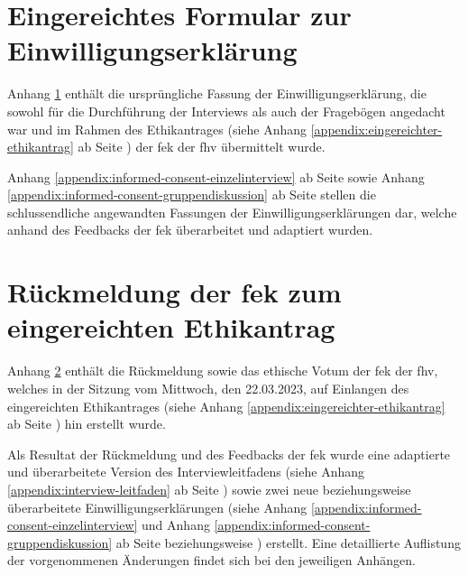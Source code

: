 \documentclass[a4paper,12pt,twoside]{scrreprt}
\begin{document}


\chapter{Eingereichtes Formular zur Einwilligungserklärung}
\label{appendix:ursprüngliches-informed-consent-formular}

Anhang \ref{appendix:ursprüngliches-informed-consent-formular} enthält die ursprüngliche Fassung der Einwilligungserklärung, die sowohl für die Durchführung der Interviews als auch der Fragebögen angedacht war und im Rahmen des Ethikantrages (siehe Anhang \ref{appendix:eingereichter-ethikantrag} ab Seite \pageref{appendix:eingereichter-ethikantrag}) der \acl{fek} der \acl{fhv} übermittelt wurde.

\medskip

Anhang \ref{appendix:informed-consent-einzelinterview} ab Seite \pageref{appendix:informed-consent-einzelinterview} sowie Anhang \ref{appendix:informed-consent-gruppendiskussion} ab Seite \pageref{appendix:informed-consent-gruppendiskussion} stellen die schlussendliche angewandten Fassungen der Einwilligungserklärungen dar, welche anhand des Feedbacks der \ac{fek} überarbeitet und adaptiert wurden.



\chapter{Rückmeldung der \acl{fek} zum eingereichten Ethikantrag}
\label{appendix:rückmeldung-fek}

Anhang \ref{appendix:rückmeldung-fek} enthält die Rückmeldung sowie das ethische Votum der \acl{fek} der \acl{fhv}, welches in der Sitzung vom Mittwoch, den 22.03.2023, auf Einlangen des eingereichten Ethikantrages (siehe Anhang \ref{appendix:eingereichter-ethikantrag} ab Seite \pageref{appendix:eingereichter-ethikantrag}) hin erstellt wurde.

\medskip

Als Resultat der Rückmeldung und des Feedbacks der \ac{fek} wurde eine adaptierte und überarbeitete Version des Interviewleitfadens (siehe Anhang \ref{appendix:interview-leitfaden} ab Seite \pageref{appendix:interview-leitfaden}) sowie zwei neue beziehungsweise überarbeitete Einwilligungserklärungen (siehe Anhang \ref{appendix:informed-consent-einzelinterview} und Anhang \ref{appendix:informed-consent-gruppendiskussion} ab Seite \pageref{appendix:informed-consent-einzelinterview} beziehungsweise \pageref{appendix:informed-consent-gruppendiskussion}) erstellt. Eine detaillierte Auflistung der vorgenommenen Änderungen findet sich bei den jeweiligen Anhängen.
\end{document}
